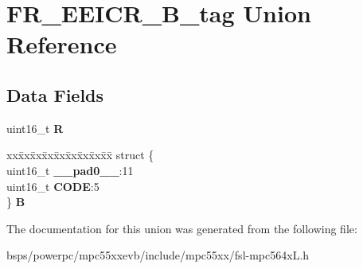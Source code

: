 \hypertarget{unionFR__EEICR__16B__tag}{}\section{F\+R\+\_\+\+E\+E\+I\+C\+R\+\_\+B\+\_\+tag Union Reference}
\label{unionFR__EEICR__16B__tag}
\subsection*{Data Fields}
\begin{DoxyCompactItemize}
\item 
\mbox{\label{unionFR__EEICR__16B__tag_a4452de08a7b55da53e35f6b74f1505e8}} 
uint16\+\_\+t {\bfseries R}
\item 
\mbox{\label{unionFR__EEICR__16B__tag_a1da7c01466b67e0062bf1577cab1b6fc}} 
\begin{tabbing}
xx\=xx\=xx\=xx\=xx\=xx\=xx\=xx\=xx\=\kill
struct \{\\
\>uint16\_t {\bfseries \_\_pad0\_\_}:11\\
\>uint16\_t {\bfseries CODE}:5\\
\} {\bfseries B}\\

\end{tabbing}\end{DoxyCompactItemize}


The documentation for this union was generated from the following file\+:\begin{DoxyCompactItemize}
\item 
bsps/powerpc/mpc55xxevb/include/mpc55xx/fsl-\/mpc564x\+L.\+h\end{DoxyCompactItemize}
